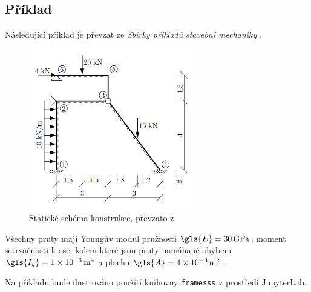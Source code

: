 \subsection{Příklad}

Následující příklad je převzat ze \textit{Sbírky příkladů stavební mechaniky} \cite[Příklad 5.2]{sbirka_prikladu}.

\begin{figure}[H]
    \includegraphics[height=7cm]{assets/figures/framesss/example_snk.png}
    \caption[Statické schéma konstrukce]{Statické schéma konstrukce, převzato z \cite[Příklad 5.2]{sbirka_prikladu}}
    \label{fig:framesss_example}
\end{figure}

Všechny pruty mají Youngův modul pružnosti $\gls{E} = \SI{30}{\GPa}$, moment setrvačnosti k ose, kolem které jsou pruty namáhané ohybem $\gls{I_y} = \SI{1e-3}{\unit{\metre\tothe{4}}}$ a plochu $\gls{A}= \SI{4e-3}{{\metre\tothe{2}}}$.

Na příkladu bude ilustrováno použití knihovny \texttt{framesss} v prostředí JupyterLab.



